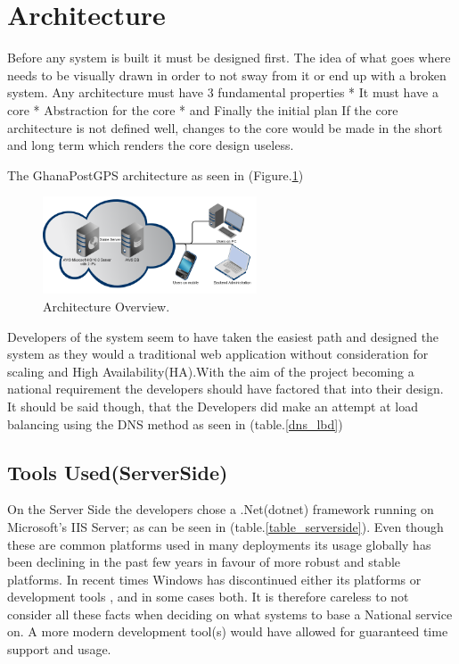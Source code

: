 \documentclass[conference,compsoc]{IEEEtran}
\begin{document}
\section{Architecture}
Before any system is built it must be designed first. The idea of what goes where
needs to be visually drawn in order to not sway from it or end up with a broken
system. Any architecture must have 3 fundamental properties\newline
* It must have a core\newline
* Abstraction for the core\newline
* and Finally the initial plan\newline
\newline
If the core architecture is not defined well, changes to the core would be made in the short and long term which
renders the core design useless.

The GhanaPostGPS architecture as seen in (Figure.\ref{fig:arch_overview})
\newline 
\begin{figure}[h!]
	\includegraphics[width=2.5in]{architecture_overview}
	\caption{Architecture Overview.}
	\label{fig:arch_overview}
\end{figure}
\newpage
Developers of the system seem to have taken the easiest path and designed the
system as they would a traditional web application without consideration for
scaling and High Availability(HA).\newline With the aim of the project becoming a national requirement the developers should have factored that into their design.
\newline
It should be said though, that the Developers did make an attempt at load balancing using the DNS method as seen in (table.\ref{dns_lbd})

\subsection{Tools Used(ServerSide)}
On the Server Side the developers chose a .Net(dotnet) framework running on Microsoft's IIS Server; as can be seen in (table.\ref{table_serverside}). Even though
these are common platforms used in many deployments its usage globally has been declining in the past few years in favour of more robust and stable platforms. 
In recent times Windows has discontinued either its platforms or development tools\cite{dotnet45:ended} \cite{dotnet45:ended2} \cite{windowsphone:discontinued} \cite{kinect:ended}, and in some cases both. It is therefore careless to not consider all these facts when deciding on what systems to base a National service on. A more modern development tool(s) would have allowed for guaranteed time support and usage. \newline
\end{document}
